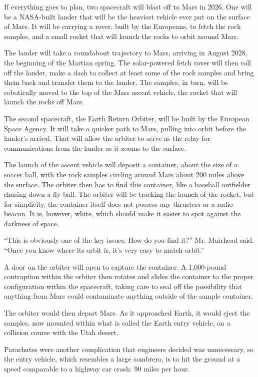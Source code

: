 If everything goes to plan, two spacecraft will blast off to Mars in
2026. One will be a NASA-built lander that will be the heaviest vehicle
ever put on the surface of Mars. It will be carrying a rover, built by
the Europeans, to fetch the rock samples, and a small rocket that will
launch the rocks to orbit around Mars.

The lander will take a roundabout trajectory to Mars, arriving in August
2028, the beginning of the Martian spring. The solar-powered fetch rover
will then roll off the lander, make a dash to collect at least some of
the rock samples and bring them back and transfer them to the lander.
The samples, in turn, will be robotically moved to the top of the Mars
ascent vehicle, the rocket that will launch the rocks off Mars.

The second spacecraft, the Earth Return Orbiter, will be built by the
European Space Agency. It will take a quicker path to Mars, pulling into
orbit before the lander's arrival. That will allow the orbiter to serve
as the relay for communications from the lander as it zooms to the
surface.

The launch of the ascent vehicle will deposit a container, about the
size of a soccer ball, with the rock samples circling around Mars about
200 miles above the surface. The orbiter then has to find this
container, like a baseball outfielder chasing down a fly ball. The
orbiter will be tracking the launch of the rocket, but for simplicity,
the container itself does not possess any thrusters or a radio beacon.
It is, however, white, which should make it easier to spot against the
darkness of space.

``This is obviously one of the key issues: How do you find it?'' Mr.
Muirhead said. ``Once you know where its orbit is, it's very easy to
match orbit.''

A door on the orbiter will open to capture the container. A 1,000-pound
contraption within the orbiter then rotates and slides the container to
the proper configuration within the spacecraft, taking care to seal off
the possibility that anything from Mars could contaminate anything
outside of the sample container.

The orbiter would then depart Mars. As it approached Earth, it would
eject the samples, now mounted within what is called the Earth entry
vehicle, on a collision course with the Utah desert.

Parachutes were another complication that engineers decided was
unnecessary, so the entry vehicle, which resembles a large sombrero, is
to hit the ground at a speed comparable to a highway car crash: 90 miles
per hour.

